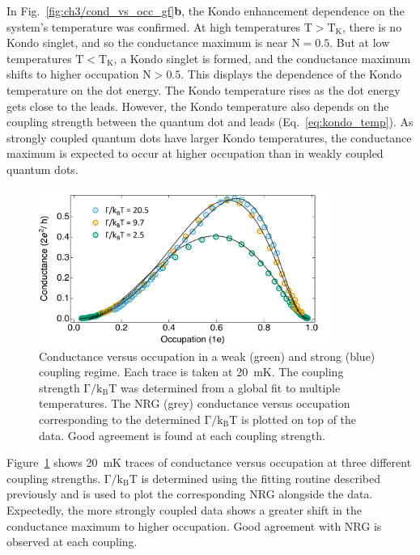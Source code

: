 In Fig.~\ref{fig:ch3/cond_vs_occ_gf}\textbf{b}, the Kondo enhancement dependence on the system's temperature was confirmed. At high temperatures $\mathrm{T>T_K}$, there is no Kondo singlet, and so the conductance maximum is near $\mathrm{N} = 0.5$. But at low temperatures $\mathrm{T<T_K}$, a Kondo singlet is formed, and the conductance maximum shifts to higher occupation $\mathrm{N} > 0.5$. This displays the dependence of the Kondo temperature on the dot energy. The Kondo temperature rises as the dot energy gets close to the leads. However, the Kondo temperature also depends on the coupling strength between the quantum dot and leads (Eq.~\ref{eq:kondo_temp}). As strongly coupled quantum dots have larger Kondo temperatures, the conductance maximum is expected to occur at higher occupation than in weakly coupled quantum dots. 

\begin{figure}[!hbt]
 \begin{center}
 \includegraphics[width=0.85\textwidth]{figures/ch3/figure15.pdf}
 \caption[Conductance versus Occupation : Varying Coupling Strength]{\label{fig:ch3/cond_occ_couplingstrength} 
 Conductance versus occupation in a weak (green) and strong (blue) coupling regime. Each trace is taken at \qty{20}{mK}. The coupling strength $\mathrm{\Gamma/k_BT}$ was determined from a global fit to multiple temperatures. The NRG (grey) conductance versus occupation corresponding to the determined $\mathrm{\Gamma/k_BT}$ is plotted on top of the data. Good agreement is found at each coupling strength.}
 \end{center}
\end{figure}


Figure~\ref{fig:ch3/cond_occ_couplingstrength} shows \qty{20}{mK} traces of conductance versus occupation at three different coupling strengths. $\mathrm{\Gamma/k_BT}$ is determined using the fitting routine described previously and is used to plot the corresponding NRG alongside the data. Expectedly, the more strongly coupled data shows a greater shift in the conductance maximum to higher occupation. Good agreement with NRG is observed at each coupling.






